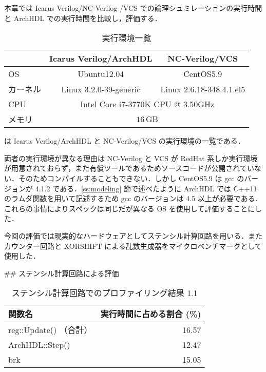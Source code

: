 本章では Icarus Verilog/NC-Verilog \cite{ncverilog}/VCS \cite{vcs} での論理シュミレーションの実行時間と
ArchHDL での実行時間を比較し，評価する．

\begin{table}[t]
 \caption{実行環境一覧}
 \label{table:exec_env}
 \begin{center}
  \begin{tabular}{lcc} \toprule
         &  Icarus Verilog/ArchHDL  &  NC-Verilog/VCS   \\ \midrule
  OS     &  Ubuntu12.04             &  CentOS5.9        \\
  カーネル &  Linux 3.2.0-39-generic  &  Linux 2.6.18-348.4.1.el5   \\
  CPU    &  \multicolumn{2}{c}{Intel Core i7-3770K CPU @ 3.50GHz}   \\
  メモリ  &  \multicolumn{2}{c}{$16\,\mathrm{GB}$}  \\ \bottomrule
  \end{tabular}
 \end{center}
\end{table}

 は Icarus Verilog/ArchHDL と NC-Verilog/VCS の実行環境の一覧である．

両者の実行環境が異なる理由は NC-Verilog と VCS が RedHat 系しか実行環境が用意されておらず，また有償ツールであるためソースコードが公開されていない．そのためコンパイルすることもできない．しかし CentOS5.9 は gcc のバージョンが 4.1.2 である．\ref{ss:modeling} 節で述べたように ArchHDL では C++11 のラムダ関数を用いて記述するため gcc のバージョンは 4.5 以上が必要である．これらの事情によりスペックは同じだが異なる OS を使用して評価することにした．

今回の評価では現実的なハードウェアとしてステンシル計算回路を用いる．またカウンター回路と XORSHIFT による乱数生成器をマイクロベンチマークとして使用した．


## ステンシル計算回路による評価

\begin{table}[t]
 \caption{ステンシル計算回路でのプロファイリング結果 1.1}
 \label{table:stencil_prof1.1}
 \begin{center}
  \begin{tabular}{lr} \toprule
  関数名 & 実行時間に占める割合 (\%) \\ \midrule
  reg::Update() （合計） & 16.57 \\
  ArchHDL::Step() & 12.47 \\
  brk & 15.05 \\ \bottomrule
  \end{tabular}
 \end{center}
\end{table}
\fi


